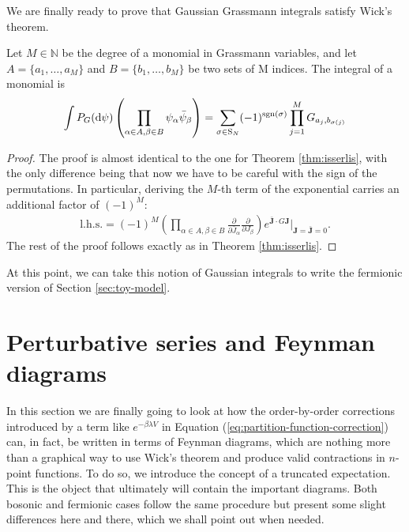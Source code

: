 We are finally ready to prove that Gaussian Grassmann integrals satisfy Wick's theorem.

\begin{theorem}
	Let $M \in \mathbb{N}$ be the degree of a monomial in Grassmann variables, and let
	$A = \{a_1, \ldots, a_M\}$ and $B = \{b_1, \ldots, b_M\}$ be two sets of M indices. The
	integral of a monomial is
	\begin{align*}
		\int P_G(\mathrm{d}\psi) \left( \prod_{\alpha\in A,\beta\in B} \psi_{\alpha}\bar\psi_{\beta} \right)
		= \sum_{\sigma \in \mathrm{S}_N} (-1)^{\mathrm{sgn}(\sigma)} \prod_{j=1}^M G_{a_j,b_{\sigma(j)}}
	\end{align*}
\end{theorem}
\begin{proof}
	The proof is almost identical to the one for Theorem \ref{thm:isserlis}, with the only
	difference being that now we have to be careful with the sign of the permutations. In
	particular, deriving the $M$-th term of the exponential carries an additional factor of
	$(-1)^M$:
	\begin{align*}
		\mathrm{l.h.s.} = (-1)^M\left(\prod_{\alpha\in A,\beta\in B}
		\frac{\partial}{\partial\bar{J}_\alpha} \frac{\partial}{\partial J_\beta}\right)
		e^{\boldsymbol{\bar J}\cdot G\boldsymbol{J}} \bigg|_{\boldsymbol{J}=\boldsymbol{\bar{J}}=0}.
	\end{align*}
	The rest of the proof follows exactly as in Theorem \ref{thm:isserlis}.
\end{proof}

At this point, we can take this notion of Gaussian integrals to write the fermionic version
of Section \ref{sec:toy-model}.

\section{Perturbative series and Feynman diagrams}

In this section we are finally going to look at how the order-by-order corrections introduced
by a term like $e^{-\beta\lambda V}$ in Equation (\ref{eq:partition-function-correction}) can,
in fact, be written in terms of Feynman diagrams, which are nothing more than a graphical
way to use Wick's theorem and produce valid contractions in $n$-point functions. To do so, we
introduce the concept of a truncated expectation. This is the object that ultimately will
contain the important diagrams. Both bosonic and fermionic cases follow the same procedure but
present some slight differences here and there, which we shall point out when needed.

